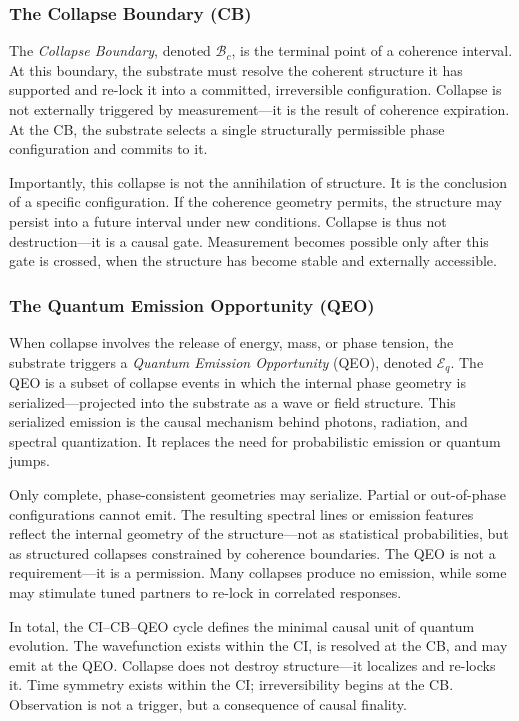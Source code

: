 \documentclass[preprints,article,submit,pdftex,moreauthors]{Definitions/mdpi}
\begin{document}
\subsubsection{The Collapse Boundary (CB)}

The \textit{Collapse Boundary}, denoted \( \mathcal{B}_c \), is the terminal point of a coherence interval. At this boundary, the substrate must resolve the coherent structure it has supported and re-lock it into a committed, irreversible configuration. Collapse is not externally triggered by measurement—it is the result of coherence expiration. At the CB, the substrate selects a single structurally permissible phase configuration and commits to it.

Importantly, this collapse is not the annihilation of structure. It is the conclusion of a specific configuration. If the coherence geometry permits, the structure may persist into a future interval under new conditions. Collapse is thus not destruction—it is a causal gate. Measurement becomes possible only after this gate is crossed, when the structure has become stable and externally accessible.

\subsubsection{The Quantum Emission Opportunity (QEO)}

When collapse involves the release of energy, mass, or phase tension, the substrate triggers a \textit{Quantum Emission Opportunity} (QEO), denoted \( \mathcal{E}_q \). The QEO is a subset of collapse events in which the internal phase geometry is serialized—projected into the substrate as a wave or field structure. This serialized emission is the causal mechanism behind photons, radiation, and spectral quantization. It replaces the need for probabilistic emission or quantum jumps.

Only complete, phase-consistent geometries may serialize. Partial or out-of-phase configurations cannot emit. The resulting spectral lines or emission features reflect the internal geometry of the structure—not as statistical probabilities, but as structured collapses constrained by coherence boundaries. The QEO is not a requirement—it is a permission. Many collapses produce no emission, while some may stimulate tuned partners to re-lock in correlated responses.

\smallskip

In total, the CI–CB–QEO cycle defines the minimal causal unit of quantum evolution. The wavefunction exists within the CI, is resolved at the CB, and may emit at the QEO. Collapse does not destroy structure—it localizes and re-locks it. Time symmetry exists within the CI; irreversibility begins at the CB. Observation is not a trigger, but a consequence of causal finality.
\end{document}
